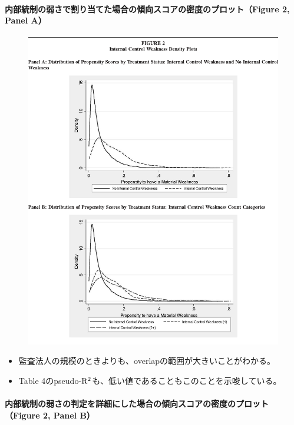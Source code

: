 \paragraph{内部統制の弱さで割り当てた場合の傾向スコアの密度のプロット（Figure 2, Panel A）}

\begin{figure}
 \centering
 \includegraphics[width=16cm]{../fig/fig02.pdf}
\end{figure}

\begin{itemize}
 \item 監査法人の規模のときよりも、overlapの範囲が大きいことがわかる。
 \item Table 4のpseudo-${\rm R^2}$も、低い値であることもこのことを示唆している。
\end{itemize}

\paragraph{内部統制の弱さの判定を詳細にした場合の傾向スコアの密度のプロット（Figure 2, Panel B）}

